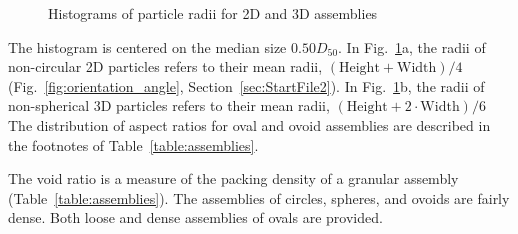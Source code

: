 \documentclass[letterpaper,11pt]{article}
\begin{document}
\begin{figure}
\centering
{}%
%
\caption{Histograms of particle radii for 2D and 3D assemblies}
\label{fig:radii}
\end{figure}
The histogram is centered on the median size $0.50D_{50}$.
In Fig.~\ref{fig:radii}a, the radii of non-circular 2D particles 
refers to their mean radii, $(\mathrm{Height} + \mathrm{Width})/4$
(Fig.~\ref{fig:orientation_angle}, Section~\ref{sec:StartFile2}).
In Fig.~\ref{fig:radii}b, the radii of non-spherical 3D particles
refers to their mean radii, $(\mathrm{Height} + 2\cdot\mathrm{Width})/6$
The distribution of aspect ratios for oval and ovoid assemblies
are described in the footnotes of Table~\ref{table:assemblies}.
\par
The void ratio is a measure of the packing density of 
a granular assembly (Table~\ref{table:assemblies}).
The assemblies of circles, spheres, and ovoids are fairly dense.
Both loose and dense assemblies of ovals are provided.
\end{document}
